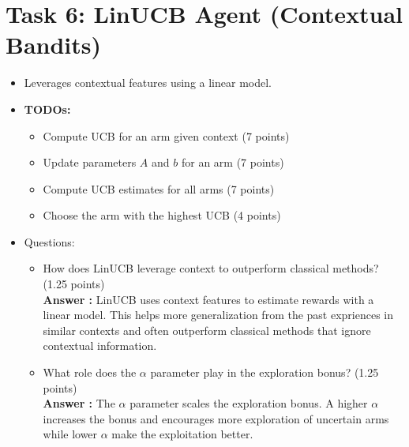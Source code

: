 \documentclass[12pt]{article}
\begin{document}
{{{\section{Task 6: LinUCB Agent (Contextual Bandits)}
\begin{itemize}[noitemsep]
    \item Leverages contextual features using a linear model.
    \item \textbf{TODOs:}
    \begin{itemize}[noitemsep]
        \item Compute UCB for an arm given context (7 points)
        \item Update parameters \(A\) and \(b\) for an arm (7 points)
        \item Compute UCB estimates for all arms (7 points)
        \item Choose the arm with the highest UCB (4 points)
    \end{itemize}
    \item Questions:
    \begin{itemize}[noitemsep]
        \item How does LinUCB leverage context to outperform classical methods? (1.25 points)\\
        \textbf{Answer :} LinUCB uses context features to estimate rewards with a linear model. This helps more generalization from the past expriences in similar contexts and often outperform classical methods that ignore contextual information.
        \item What role does the \(\alpha\) parameter play in the exploration bonus? (1.25 points)\\ 
        \textbf{Answer :} The $\alpha$ parameter scales the exploration bonus. A higher $\alpha$ increases the bonus and encourages more exploration of uncertain arms while lower $\alpha$ make the exploitation better.
    \end{itemize}
\end{itemize}

}}}
\end{document}
